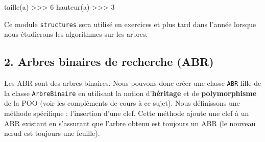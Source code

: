 \documentclass[
  a4paper,
  DIV=11,
  numbers=noendperiod]{scrartcl}
\newenvironment{Shaded}{\begin{snugshade}}{\end{snugshade}}
\newcommand{\DecValTok}[1]{\textcolor[rgb]{0.68,0.00,0.00}{#1}}
\newcommand{\NormalTok}[1]{\textcolor[rgb]{0.00,0.23,0.31}{#1}}
\newcommand{\OperatorTok}[1]{\textcolor[rgb]{0.37,0.37,0.37}{#1}}
\begin{document}
\begin{Shaded}
\begin{Highlighting}[]
\NormalTok{taille(a)}
\OperatorTok{\textgreater{}\textgreater{}\textgreater{}} \DecValTok{6}
\NormalTok{hauteur(a)}
\OperatorTok{\textgreater{}\textgreater{}\textgreater{}} \DecValTok{3}
\end{Highlighting}
\end{Shaded}

Ce module \texttt{structures} sera utilisé en exercices et plus tard
dans l'année lorsque nous étudierons les algorithmes sur les arbres.

\hypertarget{arbres-binaires-de-recherche-abr}{%
\subsection{2. Arbres binaires de recherche
(ABR)}\label{arbres-binaires-de-recherche-abr}}

Les ABR sont des arbres binaires. Nous pouvons donc créer une classe
\texttt{ABR} fille de la classe \texttt{ArbreBinaire} en utilisant la
notion d'\textbf{héritage} et de \textbf{polymorphisme} de la POO (voir
les compléments de cours à ce sujet). Nous définissons une méthode
spécifique : l'insertion d'une clef. Cette méthode ajoute une clef à un
ABR existant en s'assurant que l'arbre obtenu est toujours un ABR (le
nouveau nœud est toujours une feuille).
\end{document}
